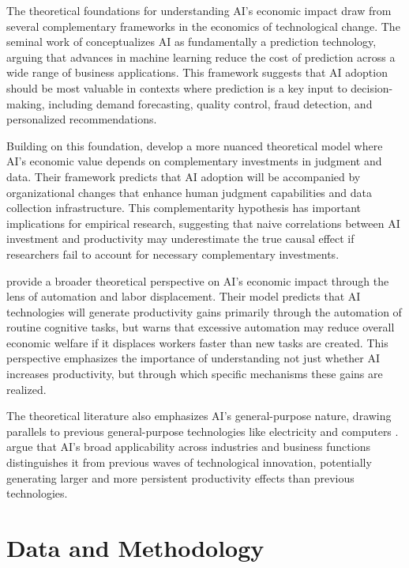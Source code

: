 \documentclass[12pt, a4paper]{article}
\begin{document}
The theoretical foundations for understanding AI's economic impact draw from several complementary frameworks in the economics of technological change. The seminal work of \citet{brynjolfsson2019artificial} conceptualizes AI as fundamentally a prediction technology, arguing that advances in machine learning reduce the cost of prediction across a wide range of business applications. This framework suggests that AI adoption should be most valuable in contexts where prediction is a key input to decision-making, including demand forecasting, quality control, fraud detection, and personalized recommendations.

Building on this foundation, \citet{agrawal2018prediction} develop a more nuanced theoretical model where AI's economic value depends on complementary investments in judgment and data. Their framework predicts that AI adoption will be accompanied by organizational changes that enhance human judgment capabilities and data collection infrastructure. This complementarity hypothesis has important implications for empirical research, suggesting that naive correlations between AI investment and productivity may underestimate the true causal effect if researchers fail to account for necessary complementary investments.

\citet{acemoglu2018race} provide a broader theoretical perspective on AI's economic impact through the lens of automation and labor displacement. Their model predicts that AI technologies will generate productivity gains primarily through the automation of routine cognitive tasks, but warns that excessive automation may reduce overall economic welfare if it displaces workers faster than new tasks are created. This perspective emphasizes the importance of understanding not just whether AI increases productivity, but through which specific mechanisms these gains are realized.

The theoretical literature also emphasizes AI's general-purpose nature, drawing parallels to previous general-purpose technologies like electricity and computers \citep{bresnahan1995general}. \citet{goldfarb2019digital} argue that AI's broad applicability across industries and business functions distinguishes it from previous waves of technological innovation, potentially generating larger and more persistent productivity effects than previous technologies.

\section{Data and Methodology}
\end{document}
